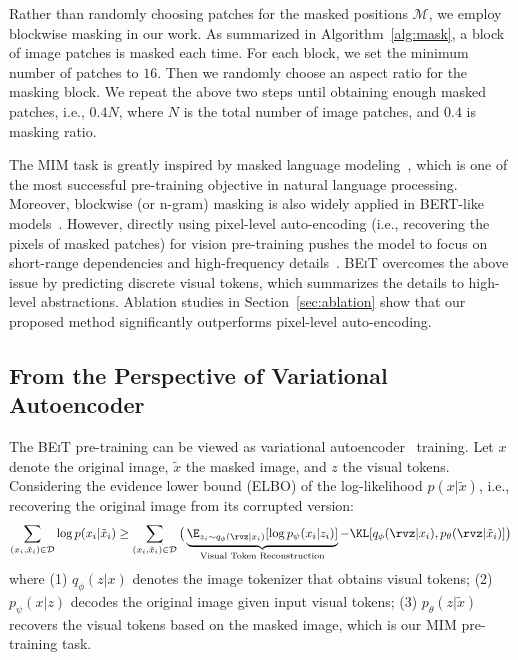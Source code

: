\documentclass{article}
\newcommand\our{\textsc{BEiT}}
\begin{document}
Rather than randomly choosing patches for the masked positions $\mathcal{M}$, we employ blockwise masking in our work.
As summarized in Algorithm~\ref{alg:mask}, a block of image patches is masked each time.
For each block, we set the minimum number of patches to $16$.
Then we randomly choose an aspect ratio for the masking block.
We repeat the above two steps until obtaining enough masked patches, i.e., $0.4 N$, where $N$ is the total number of image patches, and $0.4$ is masking ratio.

The MIM task is greatly inspired by masked language modeling~\citep{bert}, which is one of the most successful pre-training objective in natural language processing.
Moreover, blockwise (or n-gram) masking is also widely applied in BERT-like models~\citep{spanbert,unilm2,t5}.
However, directly using pixel-level auto-encoding (i.e., recovering the pixels of masked patches) for vision pre-training pushes the model to focus on short-range dependencies and high-frequency details~\citep{dalle}.
\our{} overcomes the above issue by predicting discrete visual tokens, which summarizes the details to high-level abstractions.
Ablation studies in Section~\ref{sec:ablation} show that our proposed method significantly outperforms pixel-level auto-encoding.


\subsection{From the Perspective of Variational Autoencoder}
\label{sec:vae}

The \our{} pre-training can be viewed as variational autoencoder~\citep{vae} training.
Let $x$ denote the original image, $\tilde{x}$ the masked image, and $z$ the visual tokens.
Considering the evidence lower bound (ELBO) of the log-likelihood $p(x | \tilde{x})$, i.e., recovering the original image from its corrupted version:
\begin{align}
\sum_{(x_i, \tilde{x}_i) \in \mathcal{D}} \log{p(x_i | \tilde{x}_i)} \geq \sum_{(x_i, \tilde{x}_i) \in \mathcal{D}} \big( \underbrace{\E_{z_i\sim q_{\phi}( \rvz|x_i)}[\log p_{\psi}(x_i|z_i)]}_{\text{Visual Token Reconstruction}} - \KL[q_{\phi}(\rvz|x_i) , p_{\theta}(\rvz| \tilde{x}_i) ] \big)
\label{eq:elbo}
\end{align}
where (1) $q_{\phi}(z|x)$ denotes the image tokenizer that obtains visual tokens; (2) $p_{\psi}(x|z)$ decodes the original image given input visual tokens; (3) $p_{\theta}(z| \tilde{x})$ recovers the visual tokens based on the masked image, which is our MIM pre-training task.
\end{document}
